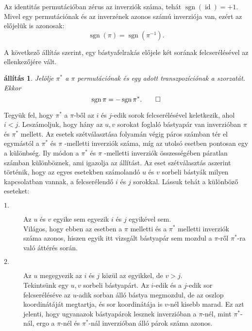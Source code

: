 \documentclass[9pt, a4paper, showtrims]{memoir}
\makeatletter
\renewenvironment{proof}[1][\proofname]
    {\par\pushQED{\qed}%
    \normalfont \topsep6\p@\@plus6\p@\relax
    \trivlist
    \item[\hskip\labelsep
        \itshape
    #1\@addpunct{:}]\ignorespaces}
    {\popQED\endtrivlist\@endpefalse}
\theoremstyle{plain}
\newtheorem{proposition}{állítás}[chapter]
\theoremstyle{remark}
\theoremstyle{definition}
\DeclareMathOperator{\sgn}{sgn}
\DeclareMathOperator{\id}{id}
\makeatother
\begin{document}
Az identitás permutációban zérus az inverziók száma,
tehát $\sgn(\id)=+1$.
Mivel egy permutációnak és az inverzének azonos számú inverziója van,
ezért az előjelük is azonosak:
\[
	\sgn\left( \pi \right)=\sgn\left( \pi^{-1} \right).
\]

A következő állítás szerint,
egy bástyafelrakás előjele két sorának felcserélésével az ellenkezőjére vált.
\begin{proposition}
	Jelölje $\pi^\ast$ a $\pi$ permutációnak és egy adott transzpozíciónak a szorzatát.
	Ekkor
	\[\sgn \pi=-\sgn\pi^\ast.\qedhere
	\]
\end{proposition}
\begin{proof}
	Tegyük fel,
	hogy $\pi^\ast$ a $\pi$-ből az $i$ és $j$-edik sorok felcserélésével keletkezik,
	ahol  $i<j$.
	Leszámoljuk,
	hogy hány az $u,v$ sorokat foglaló bástyapár van inverzióban $\pi$ és $\pi^\ast$ mellett.
	Az esetek szétválasztása folyamán végig páros számban tér el egymástól  a $\pi ^{\ast }$ és $\pi $ -melletti
	inverziók száma,
	míg az utolsó esetben pontosan egy a különbség.
	Ily módon a $\pi ^{\ast }$ és $\pi$ -melletti inverziók összességében páratlan számban különböznek,
	ami igazolja az állítást.
	Az eset szétválasztás aszerint történik, hogy az egyes esetekben számolandó $u$ és $v$ sorbeli bástyák
	milyen kapcsolatban vannak,
	a felcserélendő $i$ és $j$ sorokkal.
	Lássuk tehát a különböző eseteket:

	\begin{description}
		\item[$1.$]  Az $u$ és $v$ egyike sem egyezik $i$ és $j$ egyikével sem.\\
		      Világos, hogy ebben az esetben a $\pi $ melletti és a $\pi ^{\ast }$ melletti
		      inverziók száma azonos, hiszen egyik itt vizsgált bástyapár sem mozdul a $\pi$-ről $\pi^\ast$-ra
		      való áttérés során.

		\item[$2.$]  Az $u$ megegyezik az $i$ és $j$ közül az egyikkel, de $v>j.$\\
		      Tekintsünk egy $u,v$ sorbeli bástyapárt.
		      Az $i$-edik és a $j$-edik sor felcseréléséve az $u$-adik sorban álló bástya megmozdul,
		      de az oszlop koordinátáját megtartja, és sor koordinátája is $v$-nél kisebb marad.
		      Ez azt jelenti,
		      hogy ugyanazok bástyapárok lesznek inverzióban a $\pi$-nél, mint $\pi^\ast$-nál, ergo a
		      $\pi$-nél és $\pi^\ast$-nál inverzióban álló párok száma azonos.


\end{description}
\end{proof}
\end{document}

